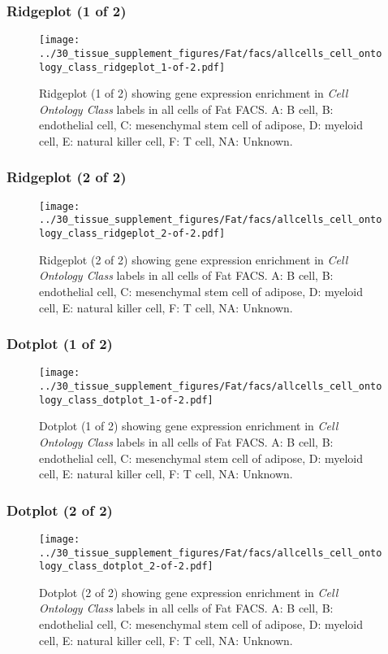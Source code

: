 \clearpage

\subsubsection{Ridgeplot (1 of 2)}
\begin{figure}[h]
\centering
\texttt{[image: ../30\_tissue\_supplement\_figures/Fat/facs/allcells\_cell\_ontology\_class\_ridgeplot\_1-of-2.pdf]}

\caption{ Ridgeplot (1 of 2)  showing gene expression enrichment in \emph{Cell Ontology Class} labels in all cells of Fat FACS. A: B cell, B: endothelial cell, C: mesenchymal stem cell of adipose, D: myeloid cell, E: natural killer cell, F: T cell, NA: Unknown.}
\end{figure}


\clearpage

\subsubsection{Ridgeplot (2 of 2)}
\begin{figure}[h]
\centering
\texttt{[image: ../30\_tissue\_supplement\_figures/Fat/facs/allcells\_cell\_ontology\_class\_ridgeplot\_2-of-2.pdf]}

\caption{ Ridgeplot (2 of 2)  showing gene expression enrichment in \emph{Cell Ontology Class} labels in all cells of Fat FACS. A: B cell, B: endothelial cell, C: mesenchymal stem cell of adipose, D: myeloid cell, E: natural killer cell, F: T cell, NA: Unknown.}
\end{figure}


\clearpage

\subsubsection{Dotplot (1 of 2)}
\begin{figure}[h]
\centering
\texttt{[image: ../30\_tissue\_supplement\_figures/Fat/facs/allcells\_cell\_ontology\_class\_dotplot\_1-of-2.pdf]}

\caption{ Dotplot (1 of 2)  showing gene expression enrichment in \emph{Cell Ontology Class} labels in all cells of Fat FACS. A: B cell, B: endothelial cell, C: mesenchymal stem cell of adipose, D: myeloid cell, E: natural killer cell, F: T cell, NA: Unknown.}
\end{figure}


\clearpage

\subsubsection{Dotplot (2 of 2)}
\begin{figure}[h]
\centering
\texttt{[image: ../30\_tissue\_supplement\_figures/Fat/facs/allcells\_cell\_ontology\_class\_dotplot\_2-of-2.pdf]}

\caption{ Dotplot (2 of 2)  showing gene expression enrichment in \emph{Cell Ontology Class} labels in all cells of Fat FACS. A: B cell, B: endothelial cell, C: mesenchymal stem cell of adipose, D: myeloid cell, E: natural killer cell, F: T cell, NA: Unknown.}
\end{figure}


